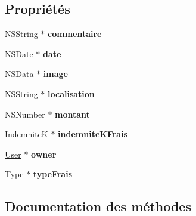 \subsection*{Propriétés}
\begin{DoxyCompactItemize}
\item 
\hypertarget{interface_frais_aece174a16c4a83346ea674cd4b270a9e}{}N\+S\+String $\ast$ {\bfseries commentaire}\label{interface_frais_aece174a16c4a83346ea674cd4b270a9e}

\item 
\hypertarget{interface_frais_a7b5285d7d9f7c9a1f607394308413b70}{}N\+S\+Date $\ast$ {\bfseries date}\label{interface_frais_a7b5285d7d9f7c9a1f607394308413b70}

\item 
\hypertarget{interface_frais_aa905362f10d0e40f7032895a34342c17}{}N\+S\+Data $\ast$ {\bfseries image}\label{interface_frais_aa905362f10d0e40f7032895a34342c17}

\item 
\hypertarget{interface_frais_ad606b88c0f628f0bad2b8b00185ed4b0}{}N\+S\+String $\ast$ {\bfseries localisation}\label{interface_frais_ad606b88c0f628f0bad2b8b00185ed4b0}

\item 
\hypertarget{interface_frais_ab29fd6de5c16407e85653614ca5bb2da}{}N\+S\+Number $\ast$ {\bfseries montant}\label{interface_frais_ab29fd6de5c16407e85653614ca5bb2da}

\item 
\hypertarget{interface_frais_aad8fcce0f0d49fa91e8e3736fee25c65}{}\hyperlink{interface_indemnite_k}{Indemnite\+K} $\ast$ {\bfseries indemnite\+K\+Frais}\label{interface_frais_aad8fcce0f0d49fa91e8e3736fee25c65}

\item 
\hypertarget{interface_frais_a59477e564c7bfb3be3f2d92d32bb4b7b}{}\hyperlink{interface_user}{User} $\ast$ {\bfseries owner}\label{interface_frais_a59477e564c7bfb3be3f2d92d32bb4b7b}

\item 
\hypertarget{interface_frais_af236bce8200a46c1fc9b449f0dccc859}{}\hyperlink{interface_type}{Type} $\ast$ {\bfseries type\+Frais}\label{interface_frais_af236bce8200a46c1fc9b449f0dccc859}

\end{DoxyCompactItemize}


\subsection{Documentation des méthodes}
\hypertarget{interface_frais_a167e8a8bc4944d05418814431c8b1928}{}
